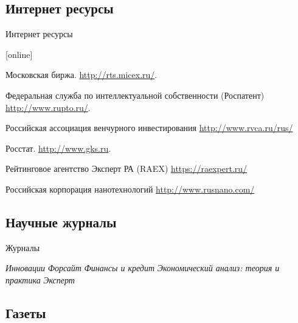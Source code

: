 \documentclass[_Venture_p1.tex]{subfiles}
\begin{document}
\subsection*{Интернет ресурсы}
\begin{frame}[allowframebreaks]{Интернет ресурсы}
    
  \begin{thebibliography}{10}
  
  [online]

    Московская биржа.
    \newblock \url{http://rts.micex.ru/}.

	Федеральная служба по интеллектуальной собственности (Роспатент)
    \newblock \url{http://www.rupto.ru/}.

	Российская ассоциация венчурного инвестирования
	\newblock \url{http://www.rvca.ru/rus/} 

\pagebreak

    Росстат.
    \newblock \url{http://www.gks.ru}.

   Рейтинговое агентство Эксперт РА (RAEX)
    \newblock \url{https://raexpert.ru/}

  	Российская корпорация нанотехнологий
    \newblock \url{http://www.rusnano.com/}


  \end{thebibliography}
\end{frame}

\subsection*{Научные журналы}

\begin{frame}{Журналы}
    
  \begin{thebibliography}{10}
  
  \beamertemplatearticlebibitems
  \bibitem{}
  {\em Инновации}
  \bibitem{}
  	{\em Форсайт}
  \bibitem{}
  	{\em Финансы и кредит}
  \bibitem{}
  	{\em Экономический анализ: теория и практика}
  \bibitem{}
  	{\em Эксперт}
  \end{thebibliography}
\end{frame}

\subsection*{Газеты}
\end{document}
